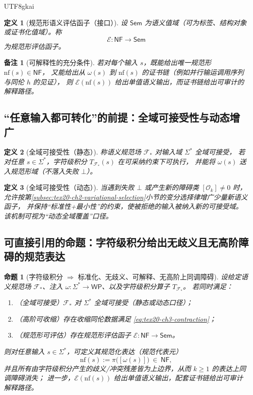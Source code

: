 \documentclass[12pt]{article}
\newtheorem{definition}{定义}[section]
\newtheorem{proposition}{命题}[section]
\newtheorem{remark}{备注}[section]
\begin{document}
\begin{CJK*}{UTF8}{gkai}
\begin{definition}[规范形语义评估函子（接口）]
设 $\mathsf{Sem}$ 为语义值域（可为标签、结构对象或证书化值域）。称
\[
\mathcal{E}:\mathsf{NF}\to \mathsf{Sem}
\]
为规范形评估函子。
\end{definition}

\begin{remark}[可解释性的充分条件]
若对每个输入 $s$，既能给出唯一规范形 $\mathrm{nf}(s)\in\mathsf{NF}$，
又能给出从 $\omega(s)$ 到 $\mathrm{nf}(s)$ 的证书链（例如并行输运调用序列与同伦 $h$ 的见证），
则 $\mathcal{E}(\mathrm{nf}(s))$ 给出单值语义输出，而证书链给出可审计的解释路径。
\end{remark}

\subsection{“任意输入都可转化”的前提：全域可接受性与动态增广}
\label{subsec:tex20-ch3-global-admissibility}

\begin{definition}[全域可接受性（静态）]
称语义规范场 $\mathcal{F}_\ast$ 对输入域 $\Sigma^\ast$ 全域可接受，
若对任意 $s\in\Sigma^\ast$，字符级积分 $T_{\mathcal{F}_\ast}(s)$ 在可采纳约束下可执行，
并能将 $\omega(s)$ 送入规范形域（不落入失败 $\bot$）。
\end{definition}

\begin{definition}[全域可接受性（动态）]
当遇到失败 $\bot$ 或产生新的障碍类 $[\mathcal{O}_k]\neq 0$ 时，
允许按第\ref{subsec:tex20-ch2-variational-selection}小节的变分选择律增广少量新语义函子，
并保持“标准性+最小性”的约束，使被拒绝的输入被纳入新的可接受域。
该机制可视为“动态全域覆盖”口径。
\end{definition}

\subsection{可直接引用的命题：字符级积分给出无歧义且无高阶障碍的规范表达}
\label{subsec:tex20-ch3-main-proposition}

\begin{proposition}[字符级积分 $\Rightarrow$ 标准化、无歧义、可解释、无高阶上同调障碍]
\label{prop:tex20-ch3-main}
设给定语义规范场 $\mathcal{F}_\ast$、注入 $\omega:\Sigma^\ast\to\mathsf{WP}$、以及字符级积分算子 $T_{\mathcal{F}_\ast}$。
若同时满足：
\begin{enumerate}
  \item （全域可接受）$\mathcal{F}_\ast$ 对 $\Sigma^\ast$ 全域可接受（静态或动态口径）；
  \item （高阶可收缩）存在收缩同伦数据满足 \eqref{eq:tex20-ch3-contraction}；
  \item （规范形可评估）存在规范形评估函子 $\mathcal{E}:\mathsf{NF}\to\mathsf{Sem}$。
\end{enumerate}
则对任意输入 $s\in\Sigma^\ast$，可定义其规范化表达（规范代表元）
\[
\mathrm{nf}(s):=\pi\bigl([\omega(s)]\bigr)\ \in\ \mathsf{NF},
\]
并且所有由字符级积分产生的歧义/冲突残差皆为上边界，从而 $k\ge 1$ 的表达上同调障碍消失；
进一步，$\mathcal{E}(\mathrm{nf}(s))$ 给出单值语义输出，配套证书链给出可审计解释路径。
\end{proposition}


\end{CJK*}
\end{document}
